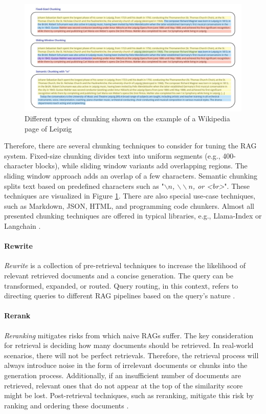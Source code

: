 \begin{figure}
    \centering
    \includegraphics[width=\textwidth]{images/Chunking.pdf}
    \caption{Different types of chunking shown on the example of a Wikipedia page of Leipzig \cite{LeipzigWikipedia.2025}}
    \label{fig:chunking}
\end{figure}

Therefore, there are several chunking techniques to consider for tuning the RAG system. Fixed-size chunking divides text into uniform segments (e.g., 400-character blocks), while sliding window variants add overlapping regions. The sliding window approach adds an overlap of a few characters. Semantic chunking splits text based on predefined characters such as "\textit{$\backslash n$, $\backslash\backslash n$, or <br>}". These techniques are visualized in Figure \ref{fig:chunking}. There are also special use-case techniques, such as Markdown, JSON, HTML, and programming code chunkers. Almost all presented chunking techniques are offered in typical libraries, e.g., Llama-Index \cite{Liu_LlamaIndex_2022} or Langchain \cite{Chase_LangChain_2022}.


\paragraph{Rewrite}
\label{sec:rewrite}
\textit{Rewrite} is a collection of pre-retrieval techniques to increase the likelihood of relevant retrieved documents and a concise generation. The query can be transformed, expanded, or routed. Query routing, in this context, refers to directing queries to different RAG pipelines based on the query's nature \cite{Gao.18.12.2023}.

\paragraph{Rerank}
\label{sec:rerank}
\textit{Reranking} mitigates risks from which naive RAGs suffer. The key consideration for retrieval is deciding how many documents should be retrieved. In real-world scenarios, there will not be perfect retrievals. Therefore, the retrieval process will always introduce noise in the form of irrelevant documents or chunks into the generation process. Additionally, if an insufficient number of documents are retrieved, relevant ones that do not appear at the top of the similarity score might be lost. Post-retrieval techniques, such as reranking, mitigate this risk by ranking and ordering these documents \cite{Gao.18.12.2023}.


